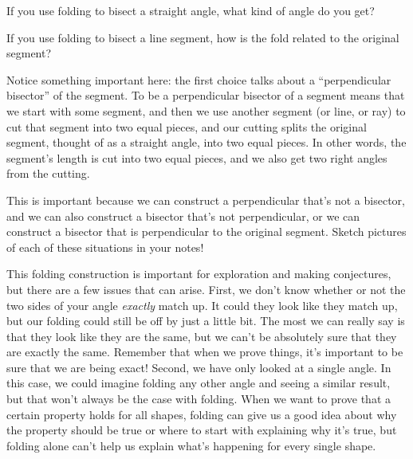 \documentclass{ximera}
\begin{document}
\begin{question}
If you use folding to bisect a straight angle, what kind of angle do you get?
\begin{multipleChoice}
\end{multipleChoice}

If you use folding to bisect a line segment, how is the fold related to the original segment?
\begin{multipleChoice}
\end{multipleChoice} 
\begin{feedback}
	Notice something important here: the first choice talks about a ``perpendicular bisector'' of the segment. To be a perpendicular bisector of a segment means that we start with some segment, and then we use another segment (or line, or ray) to cut that segment into two equal pieces, and our cutting splits the original segment, thought of as a straight angle, into two equal pieces. In other words, the segment's length is cut into two equal pieces, and we also get two right angles from the cutting.
	
	This is important because we can construct a perpendicular that's not a bisector, and we can also construct a bisector that's not perpendicular, or we can construct a bisector that is perpendicular to the original segment. Sketch pictures of each of these situations in your notes!
\end{feedback}
\end{question}

This folding construction is important for exploration and making conjectures, but there are a few issues that can arise. First, we don't know whether or not the two sides of your angle \emph{exactly} match up. It could they look like they match up, but our folding could still be off by just a little bit. The most we can really say is that they look like they are the same, but we can't be absolutely sure that they are exactly the same. Remember that when we prove things, it's important to be sure that we are being exact! Second, we have only looked at a single angle. In this case, we could imagine folding any other angle and seeing a similar result, but that won't always be the case with folding. When we want to prove that a certain property holds for all shapes, folding can give us a good idea about why the property should be true or where to start with explaining why it's true, but folding alone can't help us explain what's happening for every single shape. 
\end{document}
